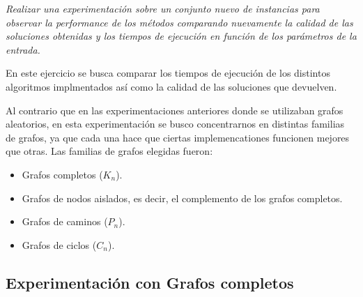 \textit{Realizar una experimentación sobre un conjunto nuevo de instancias para observar la performance de los métodos comparando nuevamente la calidad de las soluciones obtenidas y los tiempos de ejecución en función de los parámetros de la entrada.}
\medskip

En este ejercicio se busca comparar los tiempos de ejecución de los distintos algoritmos implmentados así como la calidad de las soluciones que devuelven.

Al contrario que en las experimentaciones anteriores donde se utilizaban grafos aleatorios, en esta experimentación se busco concentrarnos en distintas familias de grafos, ya que cada una hace que ciertas implemencationes funcionen mejores que otras. Las familias de grafos elegidas fueron:
\begin{itemize}
    \item Grafos completos ($K_n$).
    \item Grafos de nodos aislados, es decir, el complemento de los grafos completos.
    \item Grafos de caminos ($P_n$).
    \item Grafos de ciclos ($C_n$).
\end{itemize}

\subsection{Experimentación con Grafos completos}

